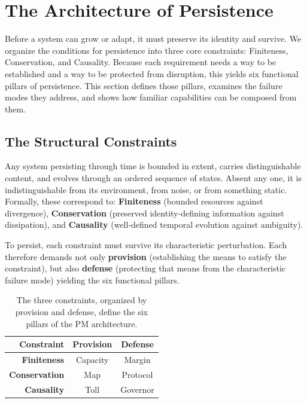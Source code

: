 \section{The Architecture of Persistence}
\label{sec:architecture_of_persistence}
Before a system can grow or adapt, it must preserve its identity and survive. We organize the conditions for persistence into three core constraints: Finiteness, Conservation, and Causality. Because each requirement needs a way to be established and a way to be protected from disruption, this yields six functional pillars of persistence. This section defines those pillars, examines the failure modes they address, and shows how familiar  capabilities can be composed from them.

\subsection{The Structural Constraints}
\label{subsec:existential_constraints}
Any system persisting through time is bounded in extent, carries distinguishable content, and evolves through an ordered sequence of states. Absent any one, it is indistinguishable from its environment, from noise, or from something static. Formally, these correspond to: \textbf{Finiteness} (bounded resources against divergence), \textbf{Conservation} (preserved identity-defining information against dissipation), and \textbf{Causality} (well-defined temporal evolution against ambiguity).

To persist, each constraint must survive its characteristic perturbation. Each therefore demands not only \textbf{provision} (establishing the means to satisfy the constraint), but also \textbf{defense} (protecting that means from the characteristic failure mode) yielding the six functional pillars.

\begin{table}[h]
\centering
\setlength{\tabcolsep}{5pt}
\renewcommand{\arraystretch}{1.5}
\begin{tabular}{r|cc}
\textbf{Constraint} & \textbf{Provision} & \textbf{Defense} \\ \hline
\textbf{Finiteness}   & Capacity & Margin \\
\textbf{Conservation} & Map      & Protocol \\
\textbf{Causality}    & Toll     & Governor
\end{tabular}
\caption{The three constraints, organized by provision and defense, define the six pillars of the PM architecture.}
\label{tab:pillars}
\end{table}

